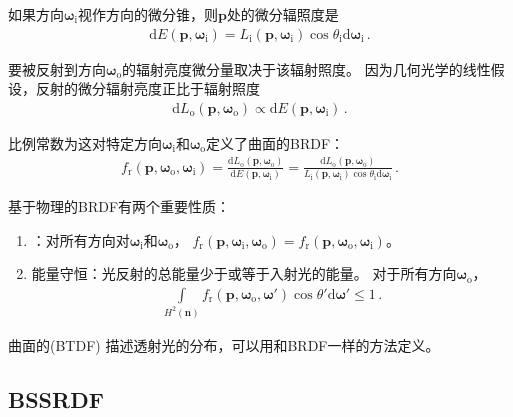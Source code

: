 如果方向${\bm\omega}_{\mathrm{i}}$视作方向的微分锥，则$\bm p$处的微分辐照度是
\begin{align}\label{eq:5.7}
    \mathrm{d}E({\bm p},{\bm\omega}_{\mathrm{i}})=L_{\mathrm{i}}({\bm p},{\bm\omega}_{\mathrm{i}})\cos\theta_{\mathrm{i}}\mathrm{d}{\bm\omega}_{\mathrm{i}}\, .
\end{align}

要被反射到方向${\bm\omega}_{\mathrm{o}}$的辐射亮度微分量取决于该辐射照度。
因为几何光学的线性假设，反射的微分辐射亮度正比于辐射照度
\begin{align*}
    \mathrm{d}L_{\mathrm{o}}({\bm p},{\bm\omega}_{\mathrm{o}})\propto\mathrm{d}E({\bm p},{\bm\omega}_{\mathrm{i}})\, .
\end{align*}

比例常数为这对特定方向${\bm\omega}_{\mathrm{i}}$和${\bm\omega}_{\mathrm{o}}$定义了曲面的BRDF：
\begin{align}\label{eq:5.8}
    f_{\mathrm{r}}({\bm p},{\bm \omega}_\mathrm{o},{\bm \omega}_\mathrm{i})=\frac{\mathrm{d}L_{\mathrm{o}}({\bm p},{\bm\omega}_{\mathrm{o}})}{\mathrm{d}E({\bm p},{\bm\omega}_{\mathrm{i}})}=\frac{\mathrm{d}L_{\mathrm{o}}({\bm p},{\bm\omega}_{\mathrm{o}})}{L_{\mathrm{i}}({\bm p},{\bm\omega}_{\mathrm{i}})\cos\theta_{\mathrm{i}}\mathrm{d}{\bm\omega}_{\mathrm{i}}}\, .
\end{align}

基于物理的BRDF有两个重要性质：
\begin{enumerate}
    \item {}：对所有方向对${\bm\omega}_{\mathrm{i}}$和${\bm\omega}_{\mathrm{o}}$，
          $f_{\mathrm{r}}({\bm p},{\bm \omega}_\mathrm{i},{\bm \omega}_\mathrm{o})=f_{\mathrm{r}}({\bm p},{\bm \omega}_\mathrm{o},{\bm \omega}_\mathrm{i})$。
    \item {\sffamily 能量守恒}：光反射的总能量少于或等于入射光的能量。
          对于所有方向${\bm\omega}_{\mathrm{o}}$，
          \begin{align*}
              \int\limits_{H^2({\bm n})}f_{\mathrm{r}}({\bm p},{\bm \omega}_\mathrm{o},{\bm \omega}')\cos\theta'\mathrm{d}{\bm\omega}'\le1\, .
          \end{align*}
\end{enumerate}

曲面的(BTDF)
描述透射光的分布，可以用和BRDF一样的方法定义。

\subsection{BSSRDF}\label{sub:BSSRDF}